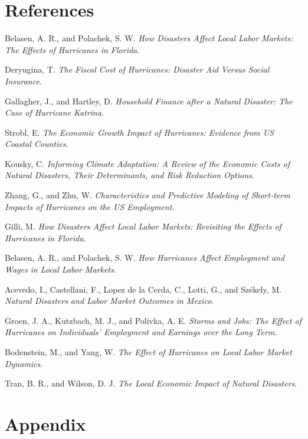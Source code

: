 \documentclass{article}
\begin{document}
\section*{References}
\begin{enumerate}[label={[{\arabic*}]}]
  \item Belasen, A. R., and Polachek, S. W. \textit{How Disasters Affect Local Labor Markets: The Effects of Hurricanes in Florida}.
  \item Deryugina, T. \textit{The Fiscal Cost of Hurricanes: Disaster Aid Versus Social Insurance}.
  \item Gallagher, J., and Hartley, D. \textit{Household Finance after a Natural Disaster: The Case of Hurricane Katrina}.
  \item Strobl, E. \textit{The Economic Growth Impact of Hurricanes: Evidence from US Coastal Counties}.
  \item Kousky, C. \textit{Informing Climate Adaptation: A Review of the Economic Costs of Natural Disasters, Their Determinants, and Risk Reduction Options}.
  \item Zhang, G., and Zhu, W. \textit{Characteristics and Predictive Modeling of Short-term Impacts of Hurricanes on the US Employment}.
  \item Gilli, M. \textit{How Disasters Affect Local Labor Markets: Revisiting the Effects of Hurricanes in Florida}.
  \item Belasen, A. R., and Polachek, S. W. \textit{How Hurricanes Affect Employment and Wages in Local Labor Markets}.
  \item Acevedo, I., Castellani, F., Lopez de la Cerda, C., Lotti, G., and Székely, M. \textit{Natural Disasters and Labor Market Outcomes in Mexico}.
  \item Groen, J. A., Kutzbach, M. J., and Polivka, A. E. \textit{Storms and Jobs: The Effect of Hurricanes on Individuals' Employment and Earnings over the Long Term}.
  \item Bodenstein, M., and Yang, W. \textit{The Effect of Hurricanes on Local Labor Market Dynamics}.
  \item Tran, B. R., and Wilson, D. J. \textit{The Local Economic Impact of Natural Disasters}.
\end{enumerate}

\appendix

\section*{Appendix}
\end{document}
